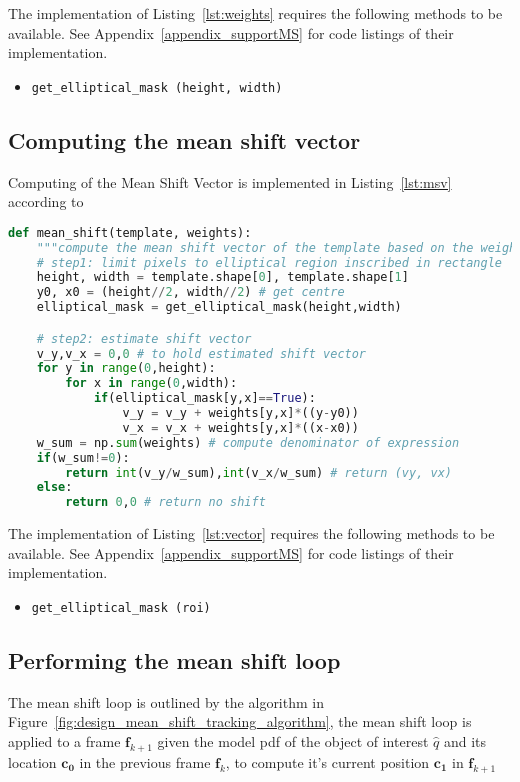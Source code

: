 The implementation of Listing~\ref{lst:weights} requires the following methods to
be available. See Appendix~\ref{appendix_supportMS} for code listings of their implementation. 
\begin{itemize}
    \item \lstinline{get_elliptical_mask (height, width)}
\end{itemize}

\subsection{Computing the mean shift vector}
Computing of the Mean Shift Vector is implemented in Listing~\ref{lst:msv}
according to %

\begin{lstlisting}[language=Python, caption={Function computing the mean shift vector}, captionpos=b, label={lst:msv}]
def mean_shift(template, weights):
    """compute the mean shift vector of the template based on the weights"""
    # step1: limit pixels to elliptical region inscribed in rectangle
    height, width = template.shape[0], template.shape[1]
    y0, x0 = (height//2, width//2) # get centre 
    elliptical_mask = get_elliptical_mask(height,width)

    # step2: estimate shift vector
    v_y,v_x = 0,0 # to hold estimated shift vector
    for y in range(0,height):
        for x in range(0,width): 
            if(elliptical_mask[y,x]==True):
                v_y = v_y + weights[y,x]*((y-y0)) 
                v_x = v_x + weights[y,x]*((x-x0))
    w_sum = np.sum(weights) # compute denominator of expression
    if(w_sum!=0):
        return int(v_y/w_sum),int(v_x/w_sum) # return (vy, vx)
    else:
        return 0,0 # return no shift
\end{lstlisting}

The implementation of Listing~\ref{lst:vector} requires the following methods to
be available. See Appendix~\ref{appendix_supportMS} for code listings of their implementation. 
\begin{itemize}
    \item \lstinline{get_elliptical_mask (roi)}
\end{itemize}

\subsection{Performing the mean shift loop}
The mean shift loop is outlined by the algorithm in
Figure~\ref{fig:design_mean_shift_tracking_algorithm}, the mean shift loop is
applied to a frame $\mathbf{f}_{k+1}$ given the model pdf of the object of
interest $\hat{q}$ and its location $\mathbf{c_0}$ in the previous frame
$\mathbf{f}_{k}$, to compute it's current position $\mathbf{c_1}$ in
$\mathbf{f}_{k+1}$

